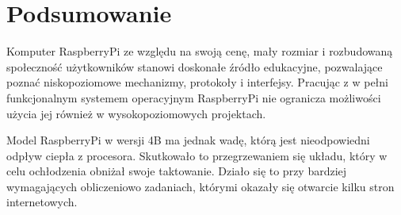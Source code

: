 \documentclass[12pt]{article}
\begin{document}
\section{Podsumowanie}
Komputer RaspberryPi ze względu na swoją cenę, mały rozmiar i rozbudowaną społeczność użytkowników stanowi doskonałe źródło edukacyjne, pozwalające poznać niskopoziomowe mechanizmy, protokoły i interfejsy. Pracując z w pełni funkcjonalnym systemem operacyjnym RaspberryPi nie ogranicza możliwości użycia jej również w wysokopoziomowych projektach. 

Model RaspberryPi w wersji 4B ma jednak wadę, którą jest nieodpowiedni odpływ ciepła z procesora. Skutkowało to przegrzewaniem się układu, który w celu ochłodzenia obniżał swoje taktowanie. Działo się to przy bardziej wymagających obliczeniowo zadaniach, którymi okazały się otwarcie kilku stron internetowych.


\end{document}
